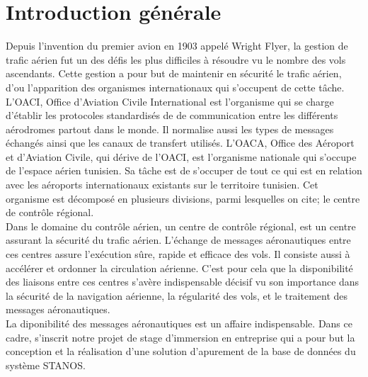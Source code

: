 \chapter*{Introduction générale} %


Depuis l’invention du premier avion en 1903 appelé Wright Flyer, la gestion de trafic aérien fut un des défis les plus difficiles à résoudre vu le nombre des vols ascendants. Cette gestion a pour but de maintenir en sécurité le trafic aérien, d’ou l’apparition des organismes internationaux qui s’occupent de cette tâche. L’OACI, Office d’Aviation Civile International est l’organisme qui se charge d’établir les protocoles standardisés de de communication entre les différents aérodromes partout dans le monde. Il normalise aussi les types de messages échangés ainsi que les canaux de transfert utilisés. L’OACA, Office des Aéroport et d’Aviation Civile, qui dérive de l’OACI, est l’organisme nationale qui s’occupe de l’espace aérien tunisien. Sa tâche est de s'occuper de tout ce qui est en relation avec les aéroports internationaux existants sur le territoire tunisien. Cet organisme est décomposé en plusieurs divisions, parmi lesquelles on cite; le centre de contrôle régional. \\

Dans le domaine du contrôle aérien, un centre de contrôle régional, est un centre assurant la sécurité du trafic aérien. L’échange de messages aéronautiques entre ces centres assure l’exécution sûre, rapide et efficace des vols. Il consiste aussi à accélérer et ordonner la circulation aérienne. C’est pour cela que la disponibilité des liaisons entre ces centres s’avère indispensable décisif vu son importance dans la sécurité de la navigation aérienne, la régularité des vols, et le traitement des messages aéronautiques. \\

La diponibilité des messages aéronautiques est un affaire indispensable. Dans ce cadre, s'inscrit notre projet de stage d'immersion en entreprise qui a pour but la conception et la réalisation d'une solution d'apurement de la base de données du système STANOS.\\

